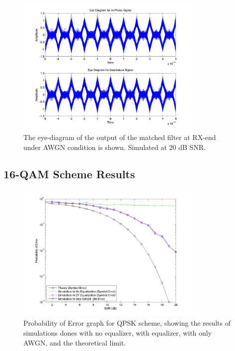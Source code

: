 \documentclass[]{article}
\begin{document}
\begin{figure}[H]
\centering
\includegraphics[width=0.8\textwidth]{awgn_eye_qpsk20.jpg}
\caption{The eye-diagram of the output of the matched filter at RX-end under AWGN condition is shown. Simulated at 20 dB SNR. \label{fig:qpEyeAWGN}}
\end{figure}

\subsection{16-QAM Scheme Results}

\begin{figure}[H]
\centering
\includegraphics[width=0.8\textwidth]{qam16SNR.jpg}
\caption{Probability of Error graph for QPSK scheme, showing the results of simulations dones with no equalizer, with equalizer, with only AWGN, and the theoretical limit. \label{fig:qamBER}}
\end{figure}
\end{document}
